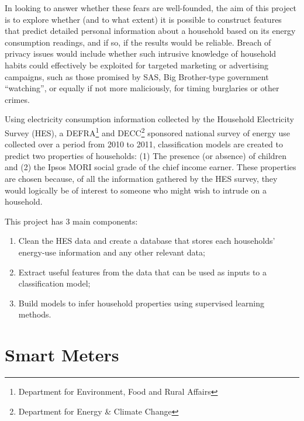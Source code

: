 In looking to answer whether these fears are well-founded, the aim of this project is to explore whether (and to what extent) it is
possible to construct features that predict detailed personal information about a household based on its energy consumption readings, and if so, if the results would be reliable. Breach of privacy issues would include whether such intrusive knowledge of household habits could effectively be exploited for targeted marketing or advertising campaigns, such as those promised by SAS, Big Brother-type government “watching”, or equally if not more maliciously, for timing burglaries or other crimes. 

Using electricity consumption information collected by the Household Electricity Survey (HES), a DEFRA\footnote{Department for Environment, Food and Rural Affairs} and DECC\footnote{Department for Energy \& Climate Change} sponsored national survey of energy use collected over a period from 2010 to 2011, classification models are created to predict two properties of households: (1) The presence (or absence) of children and (2) the Ipsos MORI social grade of the chief income earner. These properties are chosen because, of all the information gathered by the HES survey, they would logically be of interest to someone who might wish to intrude on a household.
\newline

This project has 3 main components:

\begin{enumerate}
\item Clean the HES data and create a database that stores each households' energy-use information and any other relevant data;
\item Extract useful features from the data that can be used as inputs to a classification model; 
\item Build models to infer household properties using supervised learning methods.
\end{enumerate}


\section{Smart Meters}
